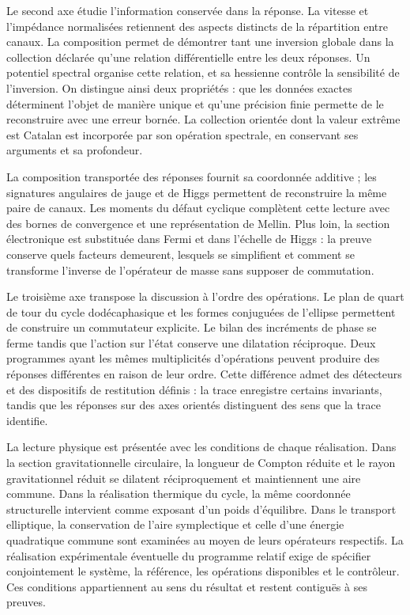 Le second axe étudie l’information conservée dans la réponse. La
vitesse et l’impédance normalisées retiennent des aspects distincts de la
répartition entre canaux. La composition permet de démontrer tant une inversion
globale dans la collection déclarée qu’une relation différentielle entre les deux
réponses. Un potentiel spectral organise cette relation, et sa hessienne
contrôle la sensibilité de l’inversion. On distingue ainsi deux propriétés :
que les données exactes déterminent l’objet de manière unique et qu’une précision
finie permette de le reconstruire avec une erreur bornée. La collection orientée dont la
valeur extrême est Catalan est incorporée par son opération spectrale,
en conservant ses arguments et sa profondeur.

La composition transportée des réponses fournit sa coordonnée
additive ; les signatures angulaires de jauge et de Higgs permettent de reconstruire
la même paire de canaux. Les moments du défaut cyclique complètent
cette lecture avec des bornes de convergence et une représentation de Mellin.
Plus loin, la section électronique est substituée dans Fermi et dans l’échelle
de Higgs : la preuve conserve quels facteurs demeurent, lesquels se simplifient
et comment se transforme l’inverse de l’opérateur de masse sans supposer de commutation.

Le troisième axe transpose la discussion à l'ordre des opérations. Le plan de quart de tour du cycle dodécaphasique et les formes conjuguées de l'ellipse permettent de construire un commutateur explicite. Le bilan des incréments de phase se ferme tandis que l'action sur l'état conserve une dilatation réciproque. Deux programmes ayant les mêmes multiplicités d'opérations peuvent produire des réponses différentes en raison de leur ordre. Cette différence admet des détecteurs et des dispositifs de restitution définis : la trace enregistre certains invariants, tandis que les réponses sur des axes orientés distinguent des sens que la trace identifie.

La lecture physique est présentée avec les conditions de chaque réalisation. Dans la section gravitationnelle circulaire, la longueur de Compton réduite et le rayon gravitationnel réduit se dilatent réciproquement et maintiennent une aire commune. Dans la réalisation thermique du cycle, la même coordonnée structurelle intervient comme exposant d'un poids d'équilibre. Dans le transport elliptique, la conservation de l'aire symplectique et celle d'une énergie quadratique commune sont examinées au moyen de leurs opérateurs respectifs. La réalisation expérimentale éventuelle du programme relatif exige de spécifier conjointement le système, la référence, les opérations disponibles et le contrôleur. Ces conditions appartiennent au sens du résultat et restent contiguës à ses preuves.

